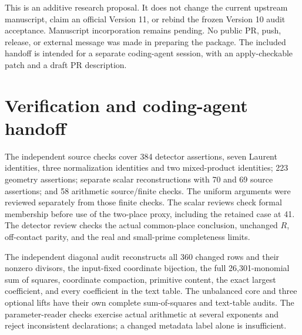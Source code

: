 \documentclass[11pt]{article}
\begin{document}
This is an additive research proposal. It does not change the current
upstream manuscript, claim an official Version 11, or rebind the frozen
Version 10 audit acceptance. Manuscript incorporation remains pending.
No public PR, push, release, or external message was made in preparing
the package. The included handoff is intended for a separate coding-agent
session, with an apply-checkable patch and a draft PR description.

\let\originaltexttt\texttt
\def\printlongprovenance#1.{\par\noindent{\small\originaltexttt{#1}}.\par\noindent}
\renewcommand{\texttt}[1]{%
  \ifnum\pdfstrcmp{\detokenize{#1}}{3f63cb782d52857446cf39f6e545aeb74f380d1347826eafa888cbb487738d51}=0
    \def\nextprovenance{\printlongprovenance{#1}}%
  \else\ifnum\pdfstrcmp{\detokenize{#1}}{78b54bcde24ff8a91091e102a4734c49878699f071d9230e5ce7a70ffd2114d0}=0
    \def\nextprovenance{\printlongprovenance{#1}}%
  \else\def\nextprovenance{\originaltexttt{#1}}\fi\fi\nextprovenance}





\section{Verification and coding-agent handoff}

The independent source checks cover 384 detector assertions, seven
Laurent identities, three normalization identities and two mixed-product
identities; 223 geometry assertions; separate scalar reconstructions
with 70 and 69 source assertions; and 58 arithmetic source/finite checks.
The uniform arguments were reviewed separately from those finite checks.
The scalar reviews check formal membership before use of the two-place
proxy, including the retained case at 41. The detector review checks
the actual common-place conclusion, unchanged $R$, off-contact parity,
and the real and small-prime completeness limits.

The independent diagonal audit reconstructs all 360 changed rows and
their nonzero divisors, the input-fixed coordinate bijection, the full
26,301-monomial sum of squares, coordinate compaction, primitive content,
the exact largest coefficient, and every coefficient in the text table.
The unbalanced core and three optional lifts have their own complete
sum-of-squares and text-table audits. The parameter-reader checks
exercise actual arithmetic at several exponents and reject inconsistent
declarations; a changed metadata label alone is insufficient.
\end{document}
